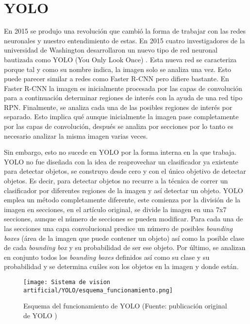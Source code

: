 \section{YOLO}
\label{chap:Sistema de visión artificial sec:YOLO}
En 2015 se produjo una revolución que cambió la forma de trabajar con las redes neuronales y nuestro entendimiento de estas. En 2015 cuatro investigadores de la universidad de Washington desarrollaron un nuevo tipo de red neuronal bautizada como YOLO (You Only Look Once) \citep{YOLO}. Esta nueva red se caracteriza porque tal y como su nombre indica, la imagen solo se analiza una vez. Esto puede parecer similar a redes como Faster R-CNN pero difiere bastante. En Faster R-CNN la imagen es inicialmente procesada por las capas de convolución para a continuación determinar regiones de interés con la ayuda de una red tipo RPN. Finalmente, se analiza cada una de las posibles regiones de interés por separado. Esto implica qué aunque inicialmente la imagen pase completamente por las capas de convolución, después se analiza por secciones por lo tanto es necesario analizar la misma imagen varias veces.

Sin embargo, esto no sucede en YOLO por la forma interna en la que trabaja. YOLO no fue diseñada con la idea de reaprovechar un clasificador ya existente para detectar objetos, se construyo desde cero y con el único objetivo de detectar objetos. Es decir, para detectar objetos no recurre a la técnica de correr un clasificador por diferentes regiones de la imagen y así detectar un objeto. YOLO emplea un método completamente diferente, este comienza por la división de la imagen en secciones, en el artículo original, se divide la imagen en una 7x7 secciones, aunque el número de secciones se pueden modificar. Para cada una de las secciones una capa convolucional predice un número de posibles \textit{bounding boxes} (área de la imagen que puede contener un objeto) así como la posible clase de cada \textit{bounding box} y su probabilidad de ser ese objeto. Por último, se analizan en conjunto todos los \textit{bounding boxes} definidos así como su clase y su probabilidad y se determina cuáles son los objetos en la imagen y donde están.

\begin{figure}[ht]
	\centering
	\texttt{[image: Sistema de vision artificial/YOLO/esquema\_funcionamiento.png]}
	\caption[Esquema del funcionamiento de YOLO]{Esquema del funcionamiento de YOLO (Fuente: publicación original de YOLO \citep{YOLO})}
	\label{chap:Sistema de visión artificial fig:Funcionamiento YOLO}
\end{figure}

